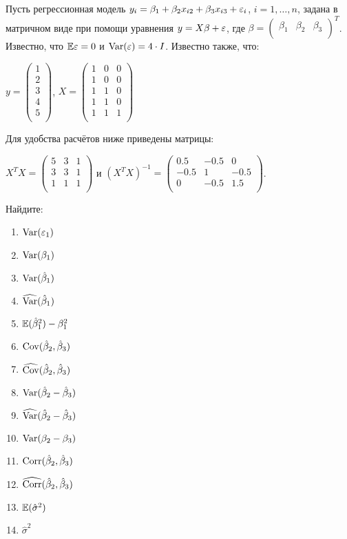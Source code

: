 \documentclass[pdftex,11pt,openany]{book}\usepackage[]{graphicx}\usepackage[]{color}
\begin{document}
\begin{problem}
Пусть регрессионная модель $y_i = \beta_1 + \beta_2 x_{i2} + \beta_3 x_{i3} + \varepsilon_i$, $i = 1, \ldots, n$, задана в матричном виде при помощи уравнения $y = X \beta + \varepsilon$, где $\beta =  \begin{pmatrix}
\beta_1 & \beta_2 & \beta_3\\
\end{pmatrix} ^T$. Известно, что $\mathbb{E} \varepsilon = 0$ и $\operatorname{Var} (\varepsilon) = 4 \cdot I$. Известно также, что:

$y =  \begin{pmatrix}
1 \\
2 \\
3 \\
4 \\
5 \\
\end{pmatrix} $, $X =  \begin{pmatrix}
1 & 0 & 0 \\
1 & 0 & 0 \\
1 & 1 & 0 \\
1 & 1 & 0 \\
1 & 1 & 1 \\
\end{pmatrix} $

Для удобства расчётов ниже приведены матрицы:

$X^T X =  \begin{pmatrix}
5 & 3 & 1 \\
3 & 3 & 1 \\
1 & 1 & 1 \\
\end{pmatrix} $ и $(X^T X)^{-1} =  \begin{pmatrix}
0.5 & -0.5 & 0 \\
-0.5 & 1 & -0.5 \\
0 & -0.5 & 1.5 \\
\end{pmatrix} $.

Найдите:
\begin{enumerate}
\item $\operatorname{Var} (\varepsilon_1)$
\item $\operatorname{Var} (\beta_1)$
\item $\operatorname{Var} (\hat{\beta}_1)$
\item $\widehat{\operatorname{Var} }(\hat{\beta}_1)$
\item $\mathbb{E} (\hat{\beta}_1^2) - \beta_1^2$
\item $\operatorname{Cov} (\hat{\beta}_2, \hat{\beta}_3)$
\item $\widehat{\operatorname{Cov} }(\hat{\beta}_2, \hat{\beta}_3)$
\item $\operatorname{Var} (\hat{\beta}_2 - \hat{\beta}_3)$
\item $\widehat{\operatorname{Var} }(\hat{\beta}_2 - \hat{\beta}_3)$
\item $\operatorname{Var} (\beta_2 - \beta_3)$
\item $\operatorname{Corr} (\hat{\beta}_2, \hat{\beta}_3)$
\item $\widehat{\operatorname{Corr}}(\hat{\beta}_2, \hat{\beta}_3)$
\item $\mathbb{E} (\hat{\sigma}^2)$
\item $\hat{\sigma}^2$
\end{enumerate}
\end{problem}
\end{document}

